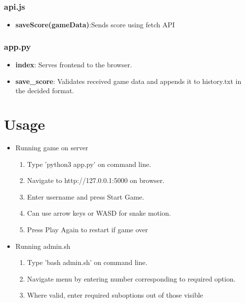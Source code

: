 \documentclass[12pt]{article}
\begin{document}
\subsubsection{api.js}
\begin{itemize}
    \item \textbf{saveScore(gameData)}:Sends score using fetch API\\
\end{itemize}
\subsubsection{app.py}
\begin{itemize}
    \item \textbf{index}: Serves frontend to the browser.\\
    
    \item \textbf{save\_score}: Validates received game data and appends it to history.txt in the decided format.\\
\end{itemize}


\section{Usage}
\begin{itemize}
\item Running game on server\\
\begin{enumerate}
    
\item Type 'python3 app.py' on command line.\\ 
\item Navigate to http://127.0.0.1:5000 on browser.\\
\item Enter username and press Start Game.\\ 
\item Can use arrow keys or WASD for snake motion.\\ 
\item Press Play Again to restart if game over

\end{enumerate}
\item Running admin.sh \\
\begin{enumerate}
\item Type 'bash admin.sh' on command line.\\ 
\item Navigate menu by entering number corresponding to required option.\\ \item Where valid, enter required suboptions out of those visible
\end{enumerate}
\end{itemize}
\end{document}
